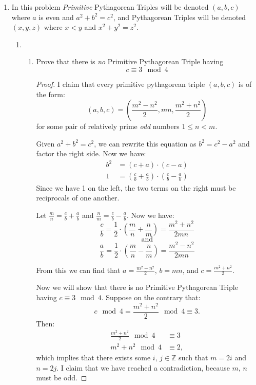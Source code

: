 \documentclass[12pt]{amsart}
\begin{document}
\begin{enumerate}
\begin{enumerate}
\end{enumerate}

\item In this problem {\it Primitive} Pythagorean Triples will be denoted $(a, b, c)$ where $a$ is even and $a^2 + b^2 = c^2$, and Pythagorean Triples will be denoted $(x,y,z)$ where $x<y$ and $x^2+y^2=z^2$.
\begin{enumerate}\setlength{\itemsep}{6pt}
\item
\begin{enumerate}\setlength{\itemsep}{6pt}
\item Prove that there is {\it no} Primitive Pythagorean Triple having
\[c \equiv 3\mod 4\]
\begin{proof}
I claim that every primitive pythagorean triple $(a, b, c)$ is of the form:
\[ (a, b, c) = \left( \frac{m^2 - n^2} 2, mn, \frac{m^2 + n^2} 2 \right) \]
for some pair of relatively prime {\it odd} numbers $1 \le n < m$. 

Given $a^2 + b^2 = c^2$,  we can rewrite this equation as $b^2 = c^2 - a^2$ and factor the right side. Now we have:
\begin{align*}
b^2 &= (c+a) \cdot (c - a) \\
1 &= \left( \frac c b + \frac a b \right) \cdot \left( \frac c b - \frac a b \right)
\end{align*}
Since we have 1 on the left, the two terms on the right must be reciprocals of one another.

Let $\frac m n = \frac c b + \frac a b$ and $\frac n m = \frac c b - \frac a b$. Now we have:
\[ \frac c b = \frac 1 2 \cdot \left( \frac m n + \frac n m \right)
= \frac {m^2 + n^2}{2mn} \]
\[ \textrm{and} \]
\[ \frac a b = \frac 1 2 \cdot \left( \frac m n - \frac n m \right)
= \frac {m^2 - n^2}{2mn} \]

From this we can find that $a = \frac {m^2 - n^2} 2$, $b = mn$, and $c = \frac {m^2 + n^2} 2$.

\bigskip

Now we will show that there is no Primitive Pythagorean Triple having $c \equiv 3\mod 4$. Suppose on the contrary that:
\[ c \mod 4 = \frac {m^2 + n^2} 2 \mod 4 \equiv 3. \]
Then:
\begin{align*}
\frac {m^2 + n^2} 2 \mod 4 &\equiv 3 \\
m^2 + n^2 \mod 4 &\equiv 2,
\end{align*}
which implies that there exists some $i,\,j\in\mathbb Z$ such that $m = 2i$ and $n=2j$. I claim that we have reached a contradiction, because $m,\,n$ must be odd.
\end{proof}


\end{enumerate}
\end{enumerate}
\end{enumerate}
\end{document}
